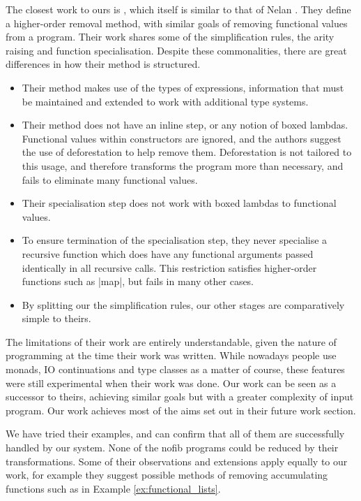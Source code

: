 \documentclass[preprint]{sigplanconf}
\begin{document}
The closest work to ours is \citet{chin:higher_order_removal}, which itself is similar to that of Nelan \cite{nelan:firstification}. They define a higher-order removal method, with similar goals of removing functional values from a program. Their work shares some of the simplification rules, the arity raising and function specialisation. Despite these commonalities, there are great differences in how their method is structured.

\begin{itemize}
\item Their method makes use of the types of expressions, information that must be maintained and extended to work with additional type systems.
\item Their method does not have an inline step, or any notion of boxed lambdas. Functional values within constructors are ignored, and the authors suggest the use of deforestation \cite{wadler:deforestation} to help remove them. Deforestation is not tailored to this usage, and therefore transforms the program more than necessary, and fails to eliminate many functional values.
\item Their specialisation step does not work with boxed lambdas to functional values.
\item To ensure termination of the specialisation step, they never specialise a recursive function which does have any functional arguments passed identically in all recursive calls. This restriction satisfies higher-order functions such as |map|, but fails in many other cases.
\item By splitting our the simplification rules, our other stages are comparatively simple to theirs.
\end{itemize}

The limitations of their work are entirely understandable, given the nature of programming at the time their work was written. While nowadays people use monads, IO continuations and type classes as a matter of course, these features were still experimental when their work was done. Our work can be seen as a successor to theirs, achieving similar goals but with a greater complexity of input program. Our work achieves most of the aims set out in their future work section.

We have tried their examples, and can confirm that all of them are successfully handled by our system. None of the nofib programs could be reduced by their transformations. Some of their observations and extensions apply equally to our work, for example they suggest possible methods of removing accumulating functions such as in Example \ref{ex:functional_lists}.
\end{document}
